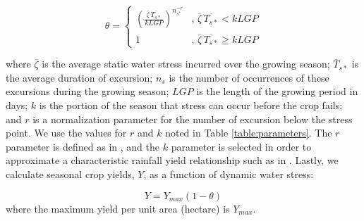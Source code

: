 \begin{equation}
    \theta = \begin{cases}
        \left( \frac{{\overline{\zeta} \, } \overline{{{T}}_{s*}}}{k{LGP}} \right)^{n^{-r}_{s^*}}
        &\text{,    }   \overline{\zeta} \, \overline{{T}_{s*}} < k{LGP} \\
        
        1  & \text{, }    {\overline{\zeta} \, } \overline{{{T}}_{s*}} \geq k{LGP}
    \end{cases}
\end{equation}



where $\overline{\zeta}$ is the average static water stress incurred over the growing season; $\overline{T}_{s*}$ is the average duration of excursion; $n_s$ is the number of occurrences of these excursions during the growing season; $LGP$ is the length of the growing period in days; $k$ is the portion of the season that stress can occur before the crop fails; and $r$ is a normalization parameter for the number of excursion below the stress point. We use the values for $r$ and $k$ noted in Table \ref{table:parameters}. The $r$ parameter is defined  as in , and the $k$ parameter is selected in order to approximate a characteristic rainfall yield relationship such as in . Lastly, we calculate seasonal crop yields, $Y$, as a function of dynamic water stress:

\begin{equation}
\label{eq:yield}
Y = Y_{max}(1-\theta)
\end{equation}
where the maximum yield per unit area (hectare) is $Y_{max}$. %

